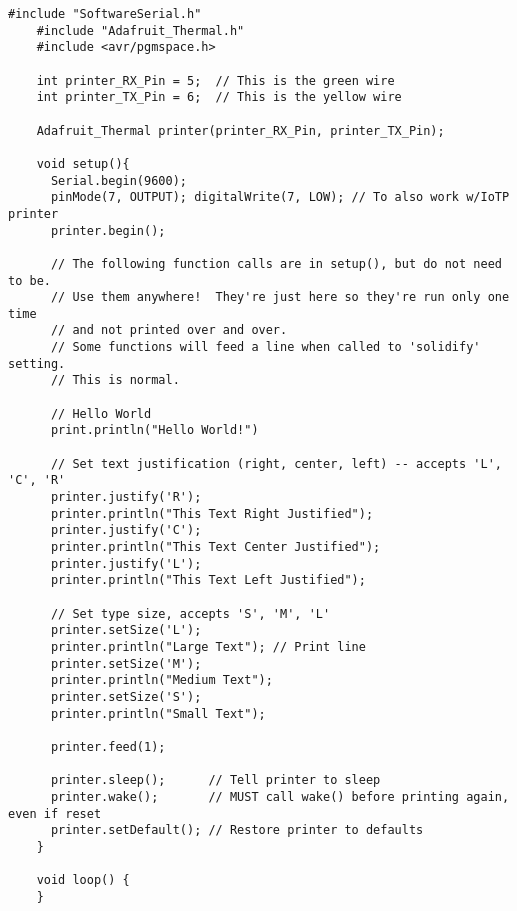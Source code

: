 \begin{Verbatim}[gobble=3,fontsize=\small]
    #include "SoftwareSerial.h"
    #include "Adafruit_Thermal.h"
    #include <avr/pgmspace.h>

    int printer_RX_Pin = 5;  // This is the green wire
    int printer_TX_Pin = 6;  // This is the yellow wire

    Adafruit_Thermal printer(printer_RX_Pin, printer_TX_Pin);

    void setup(){
      Serial.begin(9600);
      pinMode(7, OUTPUT); digitalWrite(7, LOW); // To also work w/IoTP printer
      printer.begin();

      // The following function calls are in setup(), but do not need to be.
      // Use them anywhere!  They're just here so they're run only one time
      // and not printed over and over.
      // Some functions will feed a line when called to 'solidify' setting.
      // This is normal.

      // Hello World
      print.println("Hello World!")

      // Set text justification (right, center, left) -- accepts 'L', 'C', 'R'
      printer.justify('R');
      printer.println("This Text Right Justified");
      printer.justify('C');
      printer.println("This Text Center Justified");
      printer.justify('L');
      printer.println("This Text Left Justified");

      // Set type size, accepts 'S', 'M', 'L'
      printer.setSize('L');
      printer.println("Large Text"); // Print line
      printer.setSize('M');
      printer.println("Medium Text");
      printer.setSize('S');
      printer.println("Small Text");

      printer.feed(1);

      printer.sleep();      // Tell printer to sleep
      printer.wake();       // MUST call wake() before printing again, even if reset
      printer.setDefault(); // Restore printer to defaults
    }

    void loop() {
    }
\end{Verbatim}
